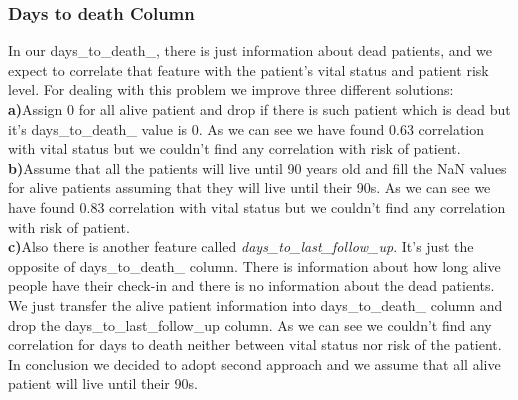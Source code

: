 \documentclass[onecolumn]{article}
\begin{document}
\subsubsection{Days to death Column}
In our days\_to\_death\_, there is just information about dead patients, and we expect to correlate that feature with the patient's vital status and patient risk level. For dealing with this problem we improve three different solutions:\\
\textbf{a)}Assign 0 for all alive patient and drop if there is such patient which is dead but it's days\_to\_death\_ value is 0. As we can see we have found 0.63 correlation with vital status but we couldn't find any correlation with risk of patient. \\
\textbf{b)}Assume that all the patients will live until 90 years old and fill the NaN values for alive patients assuming that they will live until their 90s. As we can see we have found 0.83 correlation with vital status but we couldn't find any correlation with risk of patient. \\
\textbf{c)}Also there is another feature called \emph{days\_to\_last\_follow\_up}. It's just the opposite of days\_to\_death\_ column. There is information about how long alive people have their check-in and there is no information about the dead patients. We just transfer the alive patient information into days\_to\_death\_ column and drop the days\_to\_last\_follow\_up column. As we can see we couldn't find any correlation for days to death neither between vital status nor risk of the patient.\\
In conclusion we decided to adopt second approach and we assume that all alive patient will live until their 90s.
\clearpage
\end{document}

